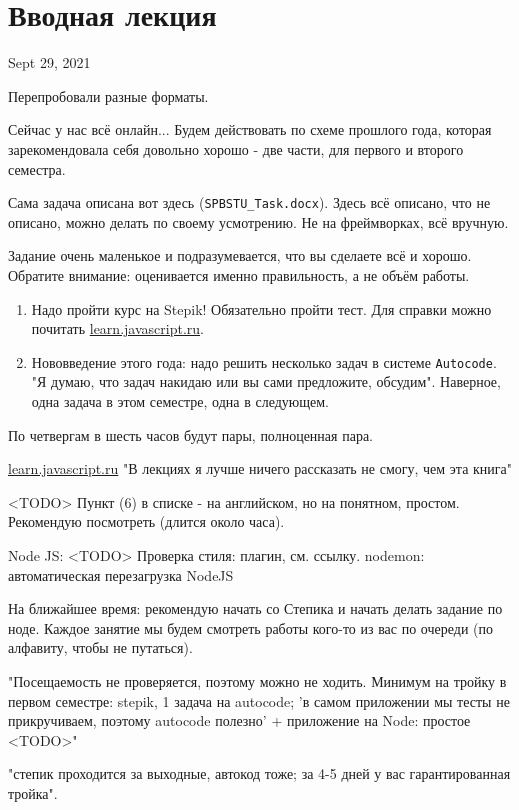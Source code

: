 \documentclass[main.tex]{subfiles}
\begin{document}
\section{Вводная лекция}

Sept 29, 2021

Перепробовали разные форматы.

Сейчас у нас всё онлайн... Будем действовать по схеме прошлого года, которая зарекомендовала себя довольно хорошо - две части, для первого и второго семестра.

Сама задача описана вот здесь (\texttt{SPBSTU\_Task.docx}).
Здесь всё описано, что не описано, можно делать по своему усмотрению.
Не на фреймворках, всё вручную.

Задание очень маленькое и подразумевается, что вы сделаете всё и хорошо.
Обратите внимание: оценивается именно правильность, а не объём работы.
\begin{enumerate}[noitemsep]
    \item Надо пройти курс на Stepik!
    Обязательно пройти тест.
    Для справки можно почитать \href{https://learn.javascript.ru}{learn.javascript.ru}.
    \item Нововведение этого года: надо решить несколько задач в системе \texttt{Autocode}. "Я думаю, что задач накидаю или вы сами предложите, обсудим".
    Наверное, одна задача в этом семестре, одна в следующем.
\end{enumerate}

По четвергам в шесть часов будут пары, полноценная пара.

\href{https://learn.javascript.ru}{learn.javascript.ru} "В лекциях я лучше ничего рассказать не смогу, чем эта книга"

<TODO> Пункт (6) в списке - на английском, но на понятном, простом. Рекомендую посмотреть (длится около часа).

Node JS: <TODO>
Проверка стиля: плагин, см. ссылку.
nodemon: автоматическая перезагрузка NodeJS

На ближайшее время: рекомендую начать со Степика и начать делать задание по ноде.
Каждое занятие мы будем смотреть работы кого-то из вас по очереди (по алфавиту, чтобы не путаться).

"Посещаемость не проверяется, поэтому можно не ходить. Минимум на тройку в первом семестре: stepik, 1 задача на autocode; 'в самом приложении мы тесты не прикручиваем, поэтому autocode полезно' + приложение на Node: простое <TODO>"

"степик проходится за выходные, автокод тоже; за 4-5 дней у вас гарантированная тройка".
\end{document}
